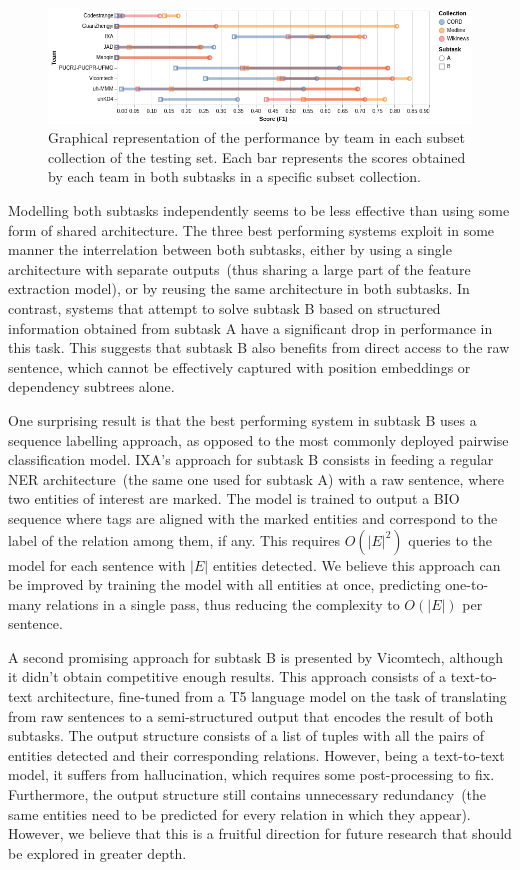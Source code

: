 \documentclass[a4paper,11pt,twocolumn,twoside]{article}
\begin{document}
\begin{figure}
  \includegraphics[width=\textwidth]{transfer.png}
  \caption{Graphical representation of the performance by team in each subset collection of the testing set. Each bar represents the scores obtained by each team in both subtasks in a specific subset collection.\label{fig:transfer}}
\end{figure}

Modelling both subtasks independently seems to be less effective than using some form of shared architecture.
The three best performing systems exploit in some manner the interrelation between both subtasks, either by using a single architecture with separate outputs~(thus sharing a large part of the feature extraction model), or by reusing the same architecture in both subtasks.
In contrast, systems that attempt to solve subtask B based on structured information obtained from subtask A have a significant drop in performance in this task.
This suggests that subtask B also benefits from direct access to the raw sentence, which cannot be effectively captured with position embeddings or dependency subtrees alone.

One surprising result is that the best performing system in subtask B uses a sequence labelling approach, as opposed to the most commonly deployed pairwise classification model.
IXA's approach for subtask B consists in feeding a regular NER architecture~(the same one used for subtask A) with a raw sentence, where two entities of interest are marked.
The model is trained to output a BIO sequence where tags are aligned with the marked entities and correspond to the label of the relation among them, if any.
This requires $O(|E|^2)$ queries to the model for each sentence with $|E|$ entities detected.
We believe this approach can be improved by training the model with all entities at once, predicting one-to-many relations in a single pass, thus reducing the complexity to $O(|E|)$ per sentence.

A second promising approach for subtask B is presented by Vicomtech, although it didn't obtain competitive enough results.
This approach consists of a text-to-text architecture, fine-tuned from a T5 language model on the task of translating from raw sentences to a semi-structured output that encodes the result of both subtasks.
The output structure consists of a list of tuples with all the pairs of entities detected and their corresponding relations.
However, being a text-to-text model, it suffers from hallucination, which requires some post-processing to fix.
Furthermore, the output structure still contains unnecessary redundancy~(the same entities need to be predicted for every relation in which they appear).
However, we believe that this is a fruitful direction for future research that should be explored in greater depth.
\end{document}
